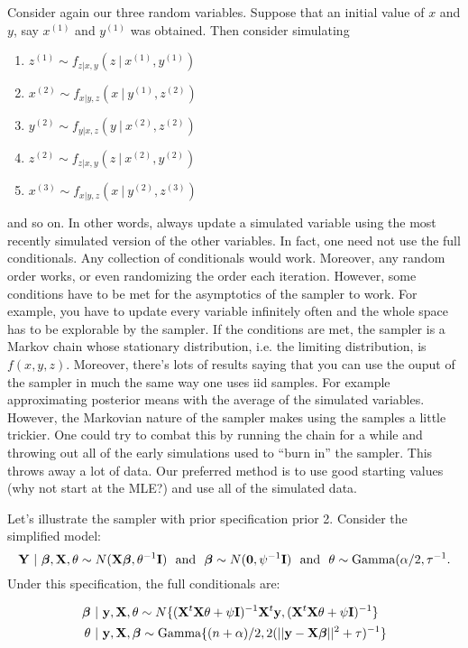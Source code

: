 Consider again our three random variables. Suppose that an initial value of $x$ and $y$, say $x^(1)$ and $y^{(1)}$ was obtained. Then consider simulating 
\begin{enumerate}
\item $z^{(1)} \sim f_{z|x,y}(z ~|~ x^{(1)}, y^{(1)})$
\item $x^{(2)} \sim f_{x|y,z}(x ~|~ y^{(1)},z^{(2)})$
\item $y^{(2)} \sim f_{y|x,z}(y ~|~ x^{(2)}, z^{(2)})$
\item $z^{(2)} \sim f_{z|x,y}(z ~|~ x^{(2)}, y^{(2)})$
\item $x^{(3)} \sim f_{x|y,z}(x ~|~ y^{(2)}, z^{(3)})$
\end{enumerate}
and so on. In other words, always update a simulated variable using the most recently simulated
version of the other variables. In fact, one need not use the full conditionals. Any collection
of conditionals would work. Moreover, any random order works, or even randomizing the order
each iteration. However, some conditions have to be met for the asymptotics of the 
sampler to work. For example, you have to update every variable infinitely often and the
whole space has to be explorable by the sampler. If the conditions are met, the sampler
is a Markov chain whose stationary distribution, i.e. the limiting distribution, is 
$f(x, y, z)$. Moreover, there's lots of results saying that you can use the ouput of the
sampler in much the same way one uses iid samples. For example approximating posterior
means with the average of the simulated variables. However, the Markovian nature of the sampler
makes using the samples a little trickier. One could try to combat this by running the chain for a while and throwing out all of the early simulations used to ``burn in'' the sampler. This throws away
a lot of data. Our preferred method is to use good starting values (why not start at the MLE?)
and use all of the simulated data. 

Let's illustrate the sampler with prior specification prior 2. Consider the
simplified model:
$$
\mathbf{Y} ~|~ \boldsymbol{\beta}, \mathbf{X}, \theta \sim N(\mathbf{X} \boldsymbol{\beta}, \theta^{-1}\mathbf{I})
~~\mbox{and}~~
\boldsymbol{\beta} \sim N(\mathbf{0}, \psi^{-1} \mathbf{I})
~~\mbox{and}~~
\theta \sim \mbox{Gamma}(\alpha / 2, \tau^{-1}.
$$
Under this specification, the full conditionals are:

\begin{align*}
\boldsymbol{\beta} & ~|~  \mathbf{y}, \mathbf{X}, \theta \sim N\{(\mathbf{X}^t \mathbf{X} \theta + \psi \mathbf{I})^{-1} \mathbf{X}^t\mathbf{y}, (\mathbf{X}^t \mathbf{X} \theta + \psi \mathbf{I})^{-1}\} \\
\theta & ~|~ \mathbf{y}, \mathbf{X}, \boldsymbol{\beta} \sim \mbox{Gamma}\{(n + \alpha) / 2, 2(||\mathbf{y} - \mathbf{X} \boldsymbol{\beta}||^2 + \tau)^{-1} \}
\end{align*}


